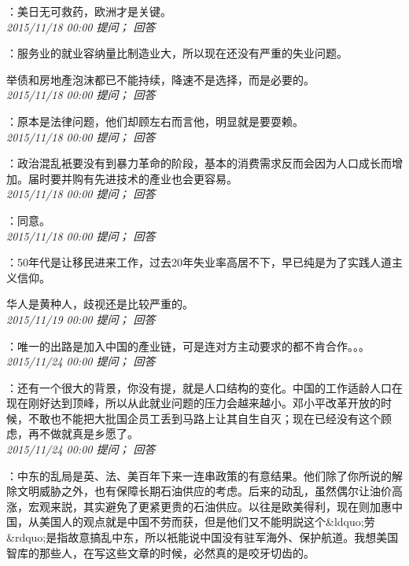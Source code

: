 \documentclass[twocolumn]{ctexart}
\begin{document}
：美日无可救药，欧洲才是关键。\\

\textit{\hfill\noindent\small 2015/11/18 00:00 提问； 回答}

：服务业的就业容纳量比制造业大，所以现在还没有严重的失业问题。

举债和房地產泡沫都已不能持续，降速不是选择，而是必要的。\\

\textit{\hfill\noindent\small 2015/11/18 00:00 提问； 回答}

：原本是法律问题，他们却顾左右而言他，明显就是要耍赖。\\

\textit{\hfill\noindent\small 2015/11/18 00:00 提问； 回答}

：政治混乱衹要没有到暴力革命的阶段，基本的消费需求反而会因为人口成长而增加。届时要并购有先进技术的產业也会更容易。\\

\textit{\hfill\noindent\small 2015/11/18 00:00 提问； 回答}

：同意。\\

\textit{\hfill\noindent\small 2015/11/18 00:00 提问； 回答}

：50年代是让移民进来工作，过去20年失业率高居不下，早已纯是为了实践人道主义信仰。

华人是黄种人，歧视还是比较严重的。\\

\textit{\hfill\noindent\small 2015/11/19 00:00 提问； 回答}

：唯一的出路是加入中国的產业链，可是连对方主动要求的都不肯合作。。。\\

\textit{\hfill\noindent\small 2015/11/24 00:00 提问； 回答}

：还有一个很大的背景，你没有提，就是人口结构的变化。中国的工作适龄人口在现在刚好达到顶峰，所以从此就业问题的压力会越来越小。邓小平改革开放的时候，不敢也不能把大批国企员工丢到马路上让其自生自灭；现在已经没有这个顾虑，再不做就真是乡愿了。\\

\textit{\hfill\noindent\small 2015/11/24 00:00 提问； 回答}

：中东的乱局是英、法、美百年下来一连串政策的有意结果。他们除了你所说的解除文明威胁之外，也有保障长期石油供应的考虑。后来的动乱，虽然偶尔让油价高涨，宏观来説，其实避免了更紧更贵的石油供应。以往是欧美得利，现在则加惠中国，从美国人的观点就是中国不劳而获，但是他们又不能明説这个\&ldquo;劳\&rdquo;是指故意搞乱中东，所以衹能说中国没有驻军海外、保护航道。我想美国智库的那些人，在写这些文章的时候，必然真的是咬牙切齿的。
\end{document}
